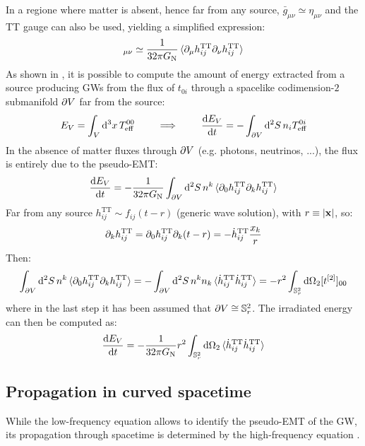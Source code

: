 In a regione where matter is absent, hence far from any source, $ \bar{g}_{\mu \nu} \simeq \eta_{\mu \nu} $ and the TT gauge can also be used, yielding a simplified expression:
\begin{equation}
  [t\od2]_{\mu \nu} \simeq \frac{1}{32\pi \gn} \braket{\pa_\mu h^\text{TT}_{ij} \pa_\nu h^\text{TT}_{ij}}
\end{equation}
As shown in , it is possible to compute the amount of energy extracted from a source producing GWs from the flux of $ t_{0i} $ through a spacelike codimension-$ 2 $ submanifold $ \partial V $ far from the source:
\begin{equation*}
  E_V = \int_V \mathrm{d}^3x \, T_\text{eff}^{00}
  \qquad \implies \qquad
  \frac{\mathrm{d} E_V}{\mathrm{d} t} = - \int_{\partial V} \mathrm{d}^2S \, n_i T_\text{eff}^{0i}
\end{equation*}
In the absence of matter fluxes through $ \partial V $ (e.g. photons, neutrinos, ...), the flux is entirely due to the pseudo-EMT:
\begin{equation*}
  \frac{\mathrm{d} E_V}{\mathrm{d} t} = - \frac{1}{32\pi G_\text{N}} \int_{\partial V} \mathrm{d}^2S \, n^k \braket{\partial_0 h^\text{TT}_{ij} \partial_k h^\text{TT}_{ij}}
\end{equation*}
Far from any source $ h^\text{TT}_{ij} \sim f_{ij}(t - r) $ (generic wave solution), with $ r \equiv \left\lvert\mathbf{x}\right\rvert $, so:
\begin{equation*}
  \partial_k h^\text{TT}_{ij} = \partial_0 h^\text{TT}_{ij} \partial_k(t - r) = - \dot{h}^\text{TT}_{ij} \frac{x_k}{r}
\end{equation*}
Then:
\begin{equation*}
  \int_{\partial V} \mathrm{d}^2S \, n^k \braket{\partial_0 h^\text{TT}_{ij} \partial_k h^\text{TT}_{ij}} = - \int_{\partial V} \mathrm{d}^2S \, n^k n_k \braket{\dot{h}^\text{TT}_{ij} \dot{h}^\text{TT}_{ij}} = - r^2 \int_{\mathbb{S}^{2}_r} \mathrm{d} \Omega_2 [t^{[2]}]_{00}
\end{equation*}
where in the last step it has been assumed that $ \partial V \cong \mathbb{S}^{2}_r $. The irradiated energy can then be computed as:
\begin{equation}
  \frac{\mathrm{d} E_V}{\mathrm{d} t} = - \frac{1}{32 \pi G_\text{N}} r^2 \int_{\mathbb{S}^{2}_r} \mathrm{d} \Omega_2 \braket{\dot{h}^\text{TT}_{ij} \dot{h}^\text{TT}_{ij}}
\end{equation}

\subsection{Propagation in curved spacetime}

While the low-frequency equation  allows to identify the pseudo-EMT of the GW, its propagation through spacetime is determined by the high-frequency equation .

